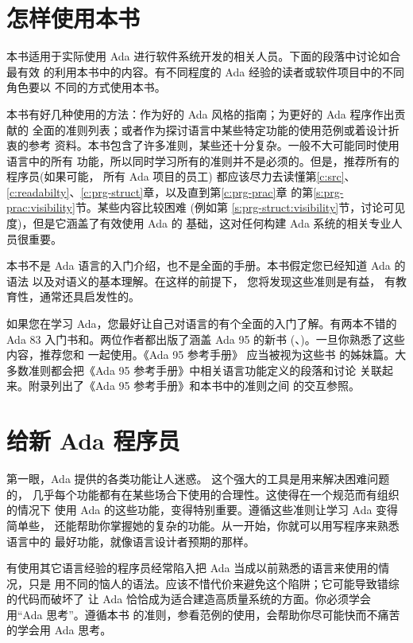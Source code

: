 \section{怎样使用本书}
本书适用于实际使用 Ada 进行软件系统开发的相关人员。下面的段落中讨论如合最有效
的利用本书中的内容。有不同程度的 Ada 经验的读者或软件项目中的不同角色要以
不同的方式使用本书。

本书有好几种使用的方法：作为好的 Ada 风格的指南；为更好的 Ada 程序作出贡献的
全面的准则列表；或者作为探讨语言中某些特定功能的使用范例或着设计折衷的参考
资料。本书包含了许多准则，某些还十分复杂。一般不大可能同时使用语言中的所有
功能，所以同时学习所有的准则并不是必须的。但是，推荐所有的程序员(如果可能，
所有 Ada 项目的员工) 都应该尽力去读懂第\ref{c:src}、
\ref{c:readabilty}、\ref{c:prg-struct}章，以及直到第\ref{c:prg-prac}章
的第\ref{s:prg-prac:visibility}节。某些内容比较困难 (例如第
\ref{s:prg-struct:visibility}节，讨论可见度)，但是它涵盖了有效使用 Ada 的
基础，这对任何构建 Ada 系统的相关专业人员很重要。

本书不是 Ada 语言的入门介绍，也不是全面的手册。本书假定您已经知道 Ada 的语法
以及对语义的基本理解。在这样的前提下， 您将发现这些准则是有益，
有教育性，通常还具启发性的。

如果您在学习 Ada，您最好让自己对语言的有个全面的入门了解。有两本不错的 Ada 83
入门书\cite{barnes89}和\cite{cohen86}。两位作者都出版了涵盖 Ada 95 的新书
(\cite{barnes96}、\cite{cohen96})。一旦你熟悉了这些内容，推荐您和
\cite{rational95}一起使用。《Ada 95 参考手册》\cite{arm95} 应当被视为这些书
的姊妹篇。大多数准则都会把《Ada 95 参考手册》中相关语言功能定义的段落和讨论
关联起来。附录\cite{a:cross-ref}列出了《Ada 95 参考手册》和本书中的准则之间
的交互参照。

\section{给新 Ada 程序员}
第一眼，Ada 提供的各类功能让人迷惑。 这个强大的工具是用来解决困难问题的，
几乎每个功能都有在某些场合下使用的合理性。这使得在一个规范而有组织的情况下
使用 Ada 的这些功能，变得特别重要。遵循这些准则让学习 Ada 变得简单些，
还能帮助你掌握她的复杂的功能。从一开始，你就可以用写程序来熟悉语言中的
最好功能，就像语言设计者预期的那样。

有使用其它语言经验的程序员经常陷入把 Ada 当成以前熟悉的语言来使用的情况，只是
用不同的恼人的语法。应该不惜代价来避免这个陷阱；它可能导致错综的代码而破坏了
让 Ada 恰恰成为适合建造高质量系统的方面。你必须学会用``Ada 思考''。遵循本书
的准则，参看范例的使用，会帮助你尽可能快而不痛苦的学会用 Ada 思考。 

